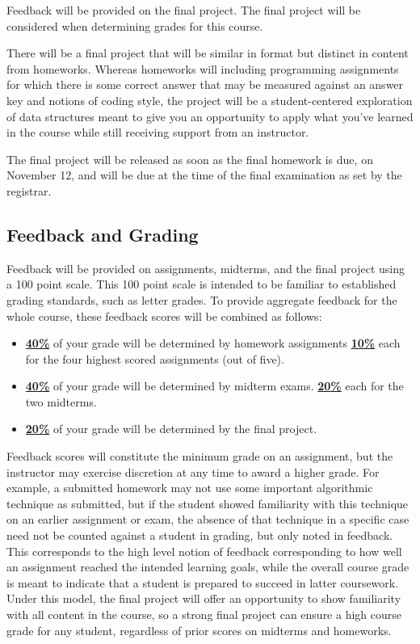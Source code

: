 \documentclass[11pt]{article}
\begin{document}
Feedback will be provided on the final project. The final project will be considered when determining grades for this course.


There will be a final project that will be similar in format but distinct in content from
homeworks. Whereas homeworks will including programming assignments for which there is
some correct answer that may be measured against an answer key and notions of coding
style, the project will be a student-centered exploration of data structures meant to
give you an opportunity to apply what you've learned in the course while still receiving
support from an instructor.

\bigskip
\noindent The final project will be released as soon as the final homework is due,
on November 12, and will be due at the time of the final examination as set 
by the registrar.

\subsection*{Feedback and Grading}
Feedback will be provided on assignments, midterms, and the final project using a 100 point scale.
This 100 point scale is intended to be familiar to established grading standards, such as letter grades. To provide aggregate feedback for the whole course, these feedback scores will be combined as follows:
\begin{itemize}
	\item \underline{\textbf{40\%}} of your grade will be determined by homework assignments
	\subitem \underline{\textbf{10\%}} each for the four highest scored assignments (out of five).
	\item \underline{\textbf{40\%}} of your grade will be determined by midterm exams.
	\subitem \underline{\textbf{20\%}} each for the two midterms.
	\item \underline{\textbf{20\%}} of your grade will be determined by the final project.
\end{itemize}

\noindent Feedback scores will constitute the minimum grade on an assignment, but the instructor
may exercise discretion at any time to award a higher grade. For example, a submitted homework
may not use some important algorithmic technique as submitted, but if the student showed familiarity
with this technique on an earlier assignment or exam, the absence of that technique in a specific
case need not be counted against a student in grading, but only noted in feedback. This corresponds to the high level notion of feedback corresponding to how well an assignment reached the intended learning goals, while the overall course grade is meant to indicate that a student is prepared to succeed in latter coursework. Under this model, the final project will offer an opportunity to show familiarity with all content in the course, so a strong final project can ensure a high course grade
for any student, regardless of prior scores on midterms and homeworks.
\end{document}
